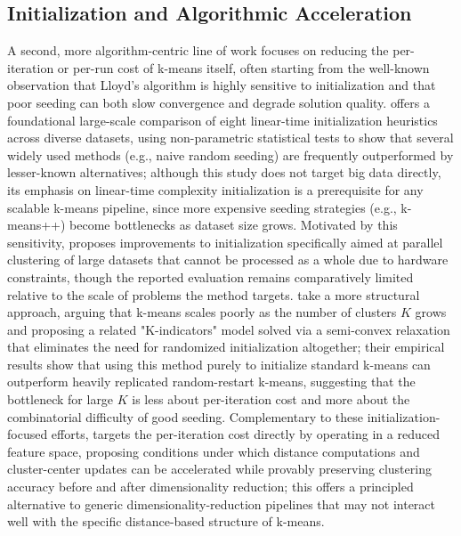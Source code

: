 \subsection{Initialization and Algorithmic Acceleration}
A second, more algorithm-centric line of work focuses on reducing the per-iteration or per-run cost of k-means itself, often starting from the well-known observation that Lloyd's algorithm is highly sensitive to initialization and that poor seeding can both slow convergence and degrade solution quality. \cite{celebi2012comparative} offers a foundational large-scale comparison of eight linear-time initialization heuristics across diverse datasets, using non-parametric statistical tests to show that several widely used methods (e.g., naive random seeding) are frequently outperformed by lesser-known alternatives; although this study does not target big data directly, its emphasis on linear-time complexity initialization is a prerequisite for any scalable k-means pipeline, since more expensive seeding strategies (e.g., k-means++) become bottlenecks as dataset size grows. Motivated by this sensitivity, \cite{ekta2018improved} proposes improvements to initialization specifically aimed at parallel clustering of large datasets that cannot be processed as a whole due to hardware constraints, though the reported evaluation remains comparatively limited relative to the scale of problems the method targets. \cite{chen2019big} take a more structural approach, arguing that k-means scales poorly as the number of clusters $K$ grows and proposing a related "K-indicators" model solved via a semi-convex relaxation that eliminates the need for randomized initialization altogether; their empirical results show that using this method purely to initialize standard k-means can outperform heavily replicated random-restart k-means, suggesting that the bottleneck for large $K$ is less about per-iteration cost and more about the combinatorial difficulty of good seeding. Complementary to these initialization-focused efforts, \cite{xie2020improvement} targets the per-iteration cost directly by operating in a reduced feature space, proposing conditions under which distance computations and cluster-center updates can be accelerated while provably preserving clustering accuracy before and after dimensionality reduction; this offers a principled alternative to generic dimensionality-reduction pipelines that may not interact well with the specific distance-based structure of k-means.

